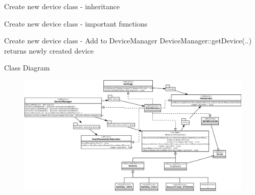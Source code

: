 \documentclass{beamer}
\institute[II. Physikalisches Institut] %
{
  II. Physikalisches Institut, Justus-Liebig-Universität Giessen
}
\date
\begin{document}
\begin{frame}
	\titlepage
\end{frame}

\begin{frame}{Create new device class - inheritance}

\end{frame}

\begin{frame}{Create new device class - important functions}

\end{frame}

\begin{frame}{Create new device class - Add to DeviceManager}
	DeviceManager::getDevice(..) returns newly created device
	\begin{tiny}
		
	\end{tiny}
\end{frame}

\begin{frame}{Class Diagram}
	\begin{figure}[H]
		\includegraphics[width=\textwidth]{generalpurposecontrol.png}
	\end{figure}
\end{frame}
\end{document}
